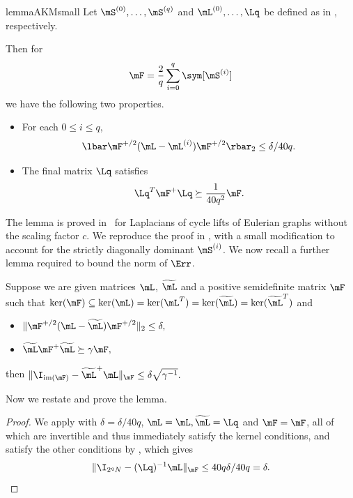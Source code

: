 %
\begin{restatable}{lemma}{AKMsmall}
\label{lem:cycleCore}
  Let $\mS^{(0)},\dots,\mS^{(q)}$ and $\mL^{(0)},\dots,\Lq$ be defined as in 
 , respectively. %
%

Then for 
$$\mF = \frac{2}{q}\sum_{i=0}^q\sym[\mS^{(i)}]$$
we have the following %
two properties. %
\begin{itemize}
    \item For each $0\leq i \leq q$,
    $$\lbar \mF^{+/2}(\mL-\mL^{(i)})\mF^{+/2}\rbar_2 \leq \delta/40q .$$ %
    
    \item The final matrix $\Lq$ satisfies 
    $${\Lq}^T \mF^{+}\Lq \succeq \frac{1}{40q^2}\mF.$$
\end{itemize}
\end{restatable}
The lemma is proved in~\cite{AhmadinejadKeMuPeSiVa19} for Laplacians of cycle lifts of Eulerian graphs without the scaling factor $c$. We reproduce the proof in , with a small modification to account for the strictly diagonally dominant
%
$\mS^{(i)}$.  %
We now recall a further lemma required to bound the norm of $\Err$.
%
\begin{lemma}\label{lem:D4}  %
Suppose we are given matrices $\mL$, $\widetilde{\mL}$ and a positive
%
semidefinite  %
matrix $\mF$ such that $\ker(\mF) \subseteq \ker(\mL) = \ker(\mL^T) = \ker(\widetilde{\mL}) = \ker(\widetilde{\mL}^T)$ and
\begin{itemize}
    \item $\|\mF^{+/2}(\mL-\widetilde{\mL})\mF^{+/2}\|_2\leq \delta,$
    \item $\widetilde{\mL}\mF^+\widetilde{\mL}\succeq \gamma \mF,$
\end{itemize}
then $\|\I_{\text{im}(\mF)}-\widetilde{\mL}^+\mL\|_\mF \leq \delta \sqrt{\gamma^{-1}}.$
\end{lemma}
%
Now we restate and prove the lemma.  %
\goodF*
\begin{proof}
  We apply  with $\delta=\delta/40q$, $\mL=\mL,\widetilde{\mL}=\Lq$ and $\mF=\mF$, all of which are invertible and thus immediately satisfy the kernel
%
conditions, %
and satisfy the other %
conditions  %
by , which gives
\[\|\I_{2^qN}-(\Lq)^{-1}\mL\|_\mF\leq 40q\delta/40q= \delta. \]
\end{proof}

